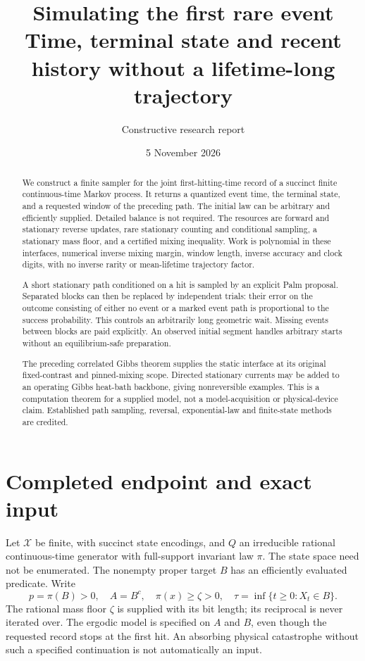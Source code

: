 \documentclass[10pt,a4paper]{article}
\title{\textbf{Simulating the first rare event}\\[3pt]
\large Time, terminal state and recent history without a lifetime-long trajectory}
\author{Constructive research report}
\date{5 November 2026}
\begin{document}
\maketitle
\begin{abstract}
We construct a finite sampler for the joint first-hitting-time record of a succinct finite continuous-time Markov process. It returns a quantized event time, the terminal state, and a requested window of the preceding path. The initial law can be arbitrary and efficiently supplied. Detailed balance is not required. The resources are forward and stationary reverse updates, rare stationary counting and conditional sampling, a stationary mass floor, and a certified mixing inequality. Work is polynomial in these interfaces, numerical inverse mixing margin, window length, inverse accuracy and clock digits, with no inverse rarity or mean-lifetime trajectory factor.

A short stationary path conditioned on a hit is sampled by an explicit Palm proposal. Separated blocks can then be replaced by independent trials: their error on the outcome consisting of either no event or a marked event path is proportional to the success probability. This controls an arbitrarily long geometric wait. Missing events between blocks are paid explicitly. An observed initial segment handles arbitrary starts without an equilibrium-safe preparation.

The preceding correlated Gibbs theorem supplies the static interface at its original fixed-contrast and pinned-mixing scope. Directed stationary currents may be added to an operating Gibbs heat-bath backbone, giving nonreversible examples. This is a computation theorem for a supplied model, not a model-acquisition or physical-device claim. Established path sampling, reversal, exponential-law and finite-state methods are credited.
\end{abstract}
\tableofcontents

\section{Completed endpoint and exact input}
Let $\mathcal X$ be finite, with succinct state encodings, and $Q$ an irreducible rational continuous-time generator with full-support invariant law $\pi$. The state space need not be enumerated. The nonempty proper target $B$ has an efficiently evaluated predicate. Write
\[
p=\pi(B)>0,\quad A=B^c,\quad \pi(x)\ge\zeta>0,\quad
\tau=\inf\{t\ge0:X_t\in B\}.
\]
The rational mass floor $\zeta$ is supplied with its bit length; its reciprocal is never iterated over. The ergodic model is specified on $A$ and $B$, even though the requested record stops at the first hit. An absorbing physical catastrophe without such a specified continuation is not automatically an input.
\end{document}
